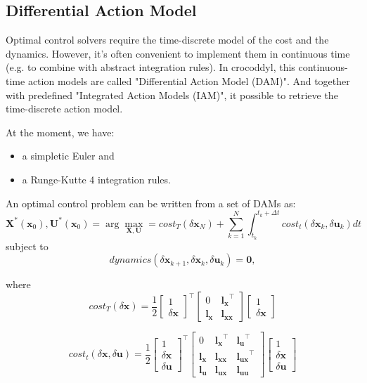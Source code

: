 \subsection{Differential Action Model}
Optimal control solvers require the time-discrete model of the cost and the dynamics. However, it's often convenient to implement them in continuous time (e.g. to combine with abstract integration rules). In crocoddyl, this continuous-time action models are called "Differential Action Model (DAM)". And together with predefined "Integrated Action Models (IAM)", it possible to retrieve the time-discrete action model.

At the moment, we have:
\begin{itemize}
\item a simpletic Euler and
\item a Runge-Kutte 4 integration rules.
\end{itemize}

An optimal control problem can be written from a set of DAMs as:
$$\mathbf{X}^*(\mathbf{x}_0),\mathbf{U}^*(\mathbf{x}_0)
=
\arg\max_{\mathbf{X},\mathbf{U}} = cost_T(\delta\mathbf{x}_N) + \sum_{k=1}^N \int_{t_k}^{t_k+\Delta t} cost_t(\delta\mathbf{x}_k, \delta\mathbf{u}_k) dt$$
subject to
$$dynamics(\delta\mathbf{x}_{k+1},\delta\mathbf{x}_k,\delta\mathbf{u}_k)=\mathbf{0},$$

where
$$cost_T(\delta\mathbf{x}) = \frac{1}{2}
\begin{bmatrix} 
  1 \\ \delta\mathbf{x}
\end{bmatrix}^\top
\begin{bmatrix}
0 & \mathbf{l_x}^\top \\
\mathbf{l_x} & \mathbf{l_{xx}}
\end{bmatrix}
\begin{bmatrix}
  1 \\ \delta\mathbf{x}
\end{bmatrix}
$$

$$cost_t(\delta\mathbf{x},\delta\mathbf{u}) = \frac{1}{2}
\begin{bmatrix} 
  1 \\ \delta\mathbf{x} \\ \delta\mathbf{u}
\end{bmatrix}^\top
\begin{bmatrix}
0 & \mathbf{l_x}^\top & \mathbf{l_u}^\top\\
\mathbf{l_x} & \mathbf{l_{xx}} & \mathbf{l_{ux}}^\top\\
\mathbf{l_u} & \mathbf{l_{ux}} & \mathbf{l_{uu}}
\end{bmatrix}
\begin{bmatrix}
  1 \\ \delta\mathbf{x} \\ \delta\mathbf{u}
\end{bmatrix}
$$

